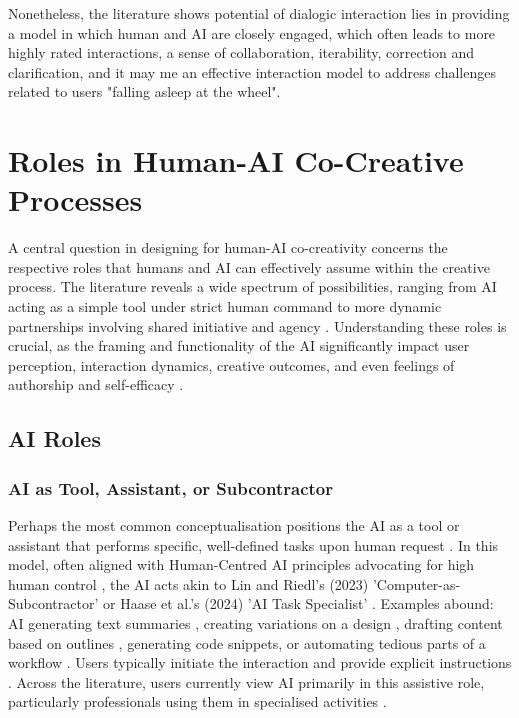 Nonetheless, the literature shows potential of dialogic interaction lies in providing a model in which human and AI are closely engaged, which often leads to more highly rated interactions, a sense of collaboration, iterability, correction and clarification, and it may me an effective interaction model to address challenges related to users "falling asleep at the wheel".

\section{Roles in Human-AI Co-Creative Processes}

A central question in designing for human-AI co-creativity concerns the respective roles that humans and AI can effectively assume within the creative process. The literature reveals a wide spectrum of possibilities, ranging from AI acting as a simple tool under strict human command to more dynamic partnerships involving shared initiative and agency \cite{Moruzzi2022-tx, Haase2024-yp, Guzdial2019-gr, Lin2023-jd}. Understanding these roles is crucial, as the framing and functionality of the AI significantly impact user perception, interaction dynamics, creative outcomes, and even feelings of authorship and self-efficacy \cite{Guzdial2019-gr, Lawton2023-tb, McGuire2024-im, Lehmann2022-kr}.

\subsection{AI Roles}

\subsubsection{AI as Tool, Assistant, or Subcontractor}

Perhaps the most common conceptualisation positions the AI as a tool or assistant that performs specific, well-defined tasks upon human request \cite{Lubart2005-zi, Norman1994-kz}. In this model, often aligned with Human-Centred AI principles advocating for high human control \cite{Shneiderman2020-je}, the AI acts akin to Lin and Riedl's (2023) 'Computer-as-Subcontractor' \cite{Lin2023-jd} or Haase et al.'s (2024) 'AI Task Specialist' \cite{Haase2024-yp}. Examples abound: AI generating text summaries \cite{Tholander2023-rv}, creating variations on a design \cite{Kim2021-fh}, drafting content based on outlines \cite{Mirowski2023-oz, Lee2024-vz}, generating code snippets, or automating tedious parts of a workflow \cite{Li2024-yh}. Users typically initiate the interaction and provide explicit instructions \cite{Oh2018-mu}. Across the literature, users currently view AI primarily in this assistive role, particularly professionals using them in specialised activities \cite{Li2024-yh, Yuan2022-kb}. 

